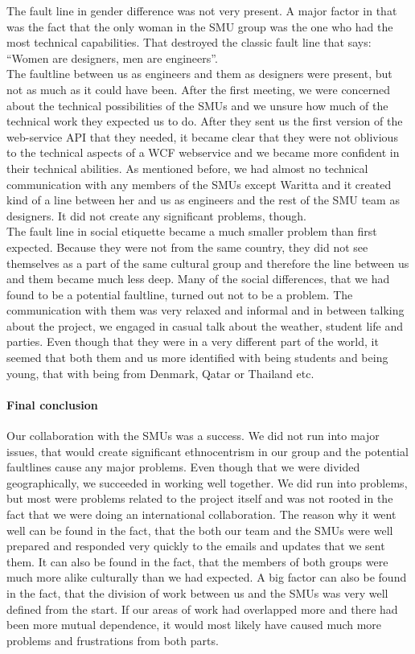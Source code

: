 \documentclass[a4paper,11pt,report]{article}
\begin{document}
The fault line in gender difference was not very present. A major factor in that was the fact that the only woman in the SMU group was the one who had the most technical capabilities. That destroyed the classic fault line that says: “Women are designers, men are engineers”.\\

The faultline between us as engineers and them as designers were present, but not as much as it could have been. After the first meeting, we were concerned about the technical possibilities of the SMUs and we unsure how much of the technical work they expected us to do. After they sent us the first version of the web-service API that they needed, it became clear that they were not oblivious to the technical aspects of a WCF webservice and we became more confident in their technical abilities. As mentioned before, we had almost no technical communication with any members of the SMUs except Waritta and it created kind of a line between her and us as engineers and the rest of the SMU team as designers. It did not create any significant problems, though. \\

The fault line in social etiquette became a much smaller problem than first expected. Because they were not from the same country, they did not see themselves as a part of the same cultural group and therefore the line between us and them became much less deep. Many of the social differences, that we had found to be a potential faultline, turned out not to be a problem. The communication with them was very relaxed and informal and in between talking about the project, we engaged in casual talk about the weather, student life and parties. Even though that they were in a very different part of the world, it seemed that both them and us more identified with being students and being young, that with being from Denmark, Qatar or Thailand etc.\\

\paragraph{Final conclusion}
Our collaboration with the SMUs was a success. We did not run into major issues, that would create significant ethnocentrism in our group and the potential faultlines cause any major problems. Even though that we were divided geographically, we succeeded in working well together. We did run into problems, but most were problems related to the project itself and was not rooted in the fact that we were doing an international collaboration. The reason why it went well can be found in the fact, that the both our team and the SMUs were well prepared and responded very quickly to the emails and updates that we sent them. It can also be found in the fact, that the members of both groups were much more alike culturally than we had expected. A big factor can also be found in the fact, that the division of work between us and the SMUs was very well defined from the start. If our areas of work had overlapped more and there had been more mutual dependence, it would most likely have caused much more problems and frustrations from both parts. 
\end{document}
